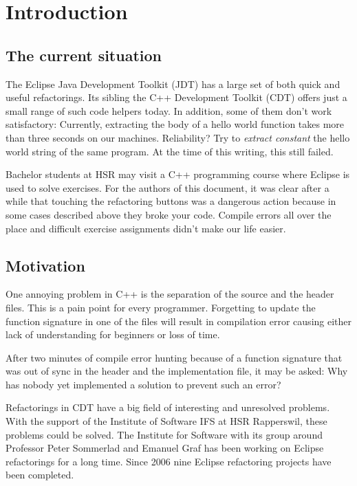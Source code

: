 \chapter{Introduction}
\thispagestyle{fancy}

\section{The current situation}

The Eclipse Java Development Toolkit (JDT) has a large set of both quick and
useful refactorings. Its sibling the C++ Development Toolkit (CDT) offers just a
small range of such code helpers today. In addition, some of them don't work
satisfactory: Currently, extracting the body of a hello world function takes
more than three seconds on our machines. Reliability? Try to \textit{extract
constant} the hello world string of the same program. At the time of this 
writing, this still failed.

Bachelor students at HSR may visit a C++ programming course where Eclipse is
used to solve exercises. For the authors of this document, it was clear after a
while that touching the refactoring buttons was a dangerous action because in
some cases described above they broke your code. Compile errors all over the
place and difficult exercise assignments didn't make our life easier.

\section{Motivation}

One annoying problem in C++ is the separation of the source and the header
files. This is a pain point for every programmer. Forgetting to update the
function signature in one of the files will result in compilation error causing
either lack of understanding for beginners or loss of time.

After two minutes of compile error hunting because of a function signature that 
was out of sync in the header and the implementation file, it may be asked: Why
has nobody yet implemented a solution to prevent such an error?

Refactorings in CDT have a big field of interesting and unresolved problems.
With the support of the Institute of Software IFS at HSR Rapperswil, these
problems could be solved. The Institute for Software with its group around
Professor Peter Sommerlad and Emanuel Graf has been working on Eclipse
refactorings for a long time. Since 2006 nine Eclipse refactoring projects have
been completed.

